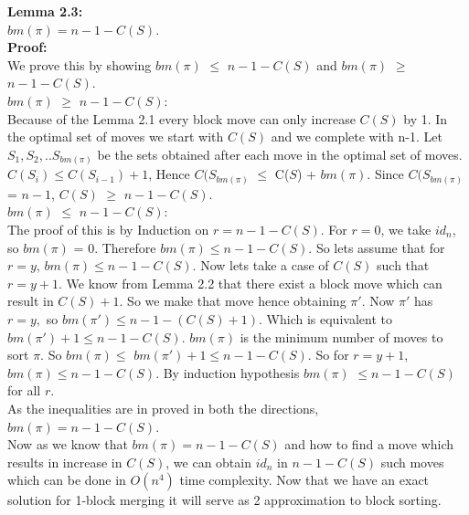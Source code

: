 \documentclass[BTech]{iitmdiss}
\begin{document}
\noindent
\textbf{Lemma 2.3:} \\
$bm(\pi) = n - 1 - C(S)$.\\
\textbf{Proof:}\\
We prove this by showing $bm(\pi)$ $\leq$ $n - 1 - C(S)$ and $bm(\pi)$ $\geq$ $n - 1 - C(S)$.\\
$bm(\pi)$ $\geq$ $n - 1 - C(S)$:\\ Because of the Lemma 2.1 every block move can only increase $C(S)$ by 1. In the optimal set of moves we start with $C(S)$ and we complete with n-1. Let $S_1 ,S_2,.. S_{bm(\pi)}$ be the sets obtained after each move in the optimal set of moves. $C(S_i) \leq C(S_{i-1}) + 1$, Hence $C(S_{bm(\pi)}$ $\leq$ C($S$) + $bm(\pi)$. Since $C(S_{bm(\pi)}$ = $n-1$, $C(S)$ $\geq$ $n-1-C(S).$\\
$bm(\pi)$ $\leq$ $n - 1 - C(S)$:\\ The proof of this is by Induction on $r = n-1-C(S).$ For $r = 0$, we take $id_n$, so $bm(\pi)$ = 0. Therefore $bm(\pi) \leq  n - 1 - C(S)$. So lets assume that for $r = y$, $bm(\pi) \leq  n-1-C(S)$. Now lets take a case of $C(S)$ such that $r = y+1$. We know from Lemma 2.2 that there exist a block move which can result in $C(S)+1$. So we make that move hence obtaining $\pi'$. Now $\pi'$ has $r = y,$ so $bm(\pi') \leq n-1-(C(S)+1)$. Which is equivalent to $bm(\pi') + 1 \leq  n-1-C(S)$. $bm(\pi)$ is the minimum number of moves to sort $\pi$. So $bm(\pi) \leq$ $bm(\pi') + 1 \leq  n-1-C(S)$. So for $r = y+1$, $bm(\pi) \leq n-1-C(S)$. By induction hypothesis $bm(\pi)$ $\leq n - 1 - C(S)$ for all $r$.\\
As the inequalities are in proved in both the directions, $bm(\pi) = n-1-C(S)$.\\
\noindent
Now as we know that $bm(\pi) = n-1-C(S)$ and how to find a move which results in increase in $C(S)$, we can obtain $id_n$ in $n-1-C(S)$ such moves which can be done in $O(n^4)$ time complexity. Now that we have an exact solution for 1-block merging it will serve as 2 approximation to block sorting.
\end{document}
